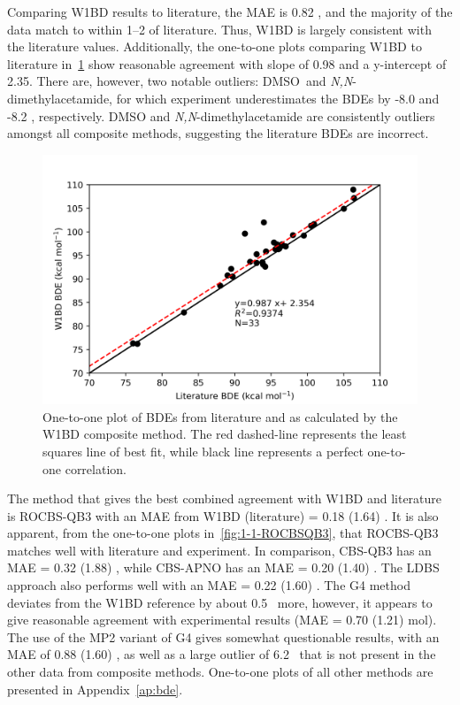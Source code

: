 Comparing W1BD results to literature, the MAE is 0.82 \kcalmol, and the
majority of the data match to within 1--2 \kcalmol of literature. Thus, W1BD is
largely consistent with the literature values. Additionally, the one-to-one
plots comparing W1BD to literature in~\ref{fig:1-1-W1BD} show reasonable
agreement with slope of 0.98 and a y-intercept of 2.35. There are, however, two
notable outliers: DMSO\footnotemark\ and \emph{N,N}-dimethylacetamide, for
which experiment underestimates the BDEs by -8.0 and -8.2 \kcalmol,
respectively. DMSO and \emph{N,N}-dimethylacetamide are consistently outliers
amongst all composite methods, suggesting the literature BDEs are incorrect.


\begin{figure}[H]
  \centering
  \includegraphics[width=\textwidth]{figures/lit-w1bd}
  \caption[One-to-one plot of BDEs from literature and as calculated by the
  W1BD composite method.]{One-to-one plot of BDEs from
  literature\protect\cite{Luo2002} and as calculated by the W1BD composite
  method. The red dashed-line represents the least squares line of best fit,
  while black line represents a perfect one-to-one correlation.}
  \label{fig:1-1-W1BD}
\end{figure}

The method that gives the best combined agreement with W1BD and literature is
ROCBS-QB3 with an MAE from W1BD (literature) = 0.18 (1.64) \kcalmol. It is also
apparent, from the one-to-one plots in~\ref{fig:1-1-ROCBSQB3}, that ROCBS-QB3
matches well with literature and experiment. In comparison, CBS-QB3 has an MAE =
0.32 (1.88) \kcalmol, while CBS-APNO has an MAE = 0.20 (1.40) \kcalmol. The LDBS
approach also performs well with an MAE = 0.22 (1.60) \kcalmol. The G4 method
deviates from the W1BD reference by about 0.5 \kcalmol\ more, however, it
appears to give reasonable agreement with experimental results (MAE = 0.70
(1.21) mol). The use of the MP2 variant of G4 gives somewhat questionable
results, with an MAE of 0.88 (1.60) \kcalmol, as well as a large outlier of 6.2
\kcalmol\ that is not present in the other data from composite methods.
One-to-one plots of all other methods are presented in Appendix~\ref{ap:bde}.

